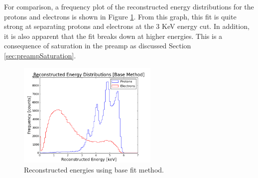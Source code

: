 









For comparison, a frequency plot of the reconstructed energy distributions for the protons and electrons is shown in Figure \ref{fig:recoEnergyFunc1}. From this graph, this fit is quite strong at separating protons and electrons at the 3 KeV energy cut. In addition, it is also apparent that the fit breaks down at higher energies. This is a consequence of saturation in the preamp as discussed Section \ref{sec:preampSaturation}.
 \begin{figure}[htp!]
    \centering
    \includegraphics[width=0.6\textwidth]{Images2/base.png}
    \caption{Reconstructed energies using base fit method.}
    \label{fig:recoEnergyFunc1}
\end{figure} 

